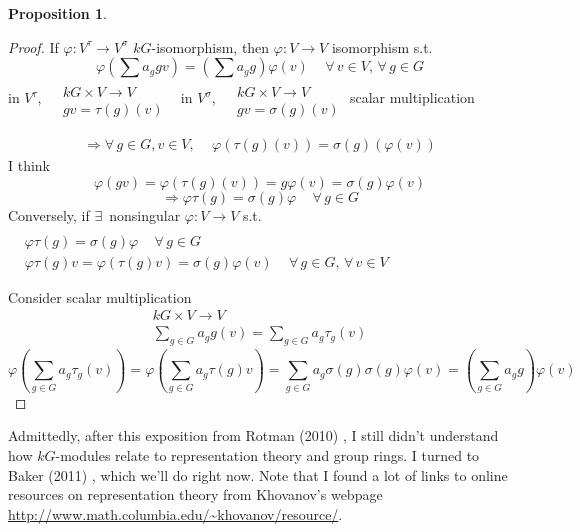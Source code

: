 \documentclass[10pt]{amsart}
\newtheorem{proposition}{Proposition}
\begin{document}
\begin{multicols*}{2}
\begin{proposition}
\end{proposition}

\begin{proof}
	If $\varphi : V^{\tau} \to V^{\sigma}$ $kG$-isomorphism, then $\varphi : V \to V$ isomorphism s.t.
	\[
	\varphi( \sum a_g g v ) = (\sum a_g g)\varphi(v) \quad \, \forall \, v \in V, \, \forall \, g \in G
	\]
	in $V^{\tau}$, $\begin{aligned} & \quad \\
	& kG \times V \to V \\
	& gv = \tau(g)(v) \end{aligned}$ \quad \quad \, in $V^{\sigma}$, $\begin{aligned} & \quad \\
	& kG \times V \to V \\
	& gv = \sigma(g)(v) \end{aligned}$ scalar multiplication
	
	\[
	\begin{gathered}
	\Longrightarrow \forall \, g \in G, v\in V, \quad \, \varphi(\tau(g)(v)) = \sigma(g)(\varphi(v))
	\end{gathered}
	\]
	I think 
	\[
	\varphi(gv) = \varphi(\tau(g)(v)) = g\varphi(v) = \sigma(g)\varphi(v)
	\]
	\[
	\Longrightarrow \varphi \tau(g) = \sigma(g) \varphi \quad \, \forall \, g \in G
	\]
	Conversely, if $\exists \, $ nonsingular $\varphi : V \to V$ s.t. $\begin{aligned} & \quad \\ 
	& \varphi \tau (g) = \sigma(g) \varphi \quad \, \forall \, g \in G \\
	& \varphi \tau(g) v = \varphi(\tau(g)v) = \sigma(g)\varphi(v) \quad \, \forall \, g \in G, \, \forall \, v \in V \end{aligned}$
	
	Consider scalar multiplication
	\[
	\begin{gathered}
	kG \times V \to V \\ 
	\sum_{g\in G} a_g g(v) = \sum_{g\in G} a_g \tau_g(v)
	\end{gathered}
	\]
	\[
	\varphi \left( \sum_{g\in G} a_g \tau_g(v) \right) = \varphi \left( \sum_{g\in G} a_g \tau(g) v\right) = \sum_{g\in G} a_g \sigma(g) \sigma(g)\varphi(v) = \left( \sum_{g\in G} a_g g \right) \varphi(v)
	\]
	
\end{proof}

Admittedly, after this exposition from Rotman (2010) \cite{JRotman2010}, I still didn't understand how $kG$-modules relate to representation theory and group rings.  I turned to Baker (2011) \cite{ABaker2011}, which we'll do right now.  Note that I found a lot of links to online resources on representation theory from Khovanov's webpage \url{http://www.math.columbia.edu/~khovanov/resource/}.  


\end{multicols*}
\end{document}
